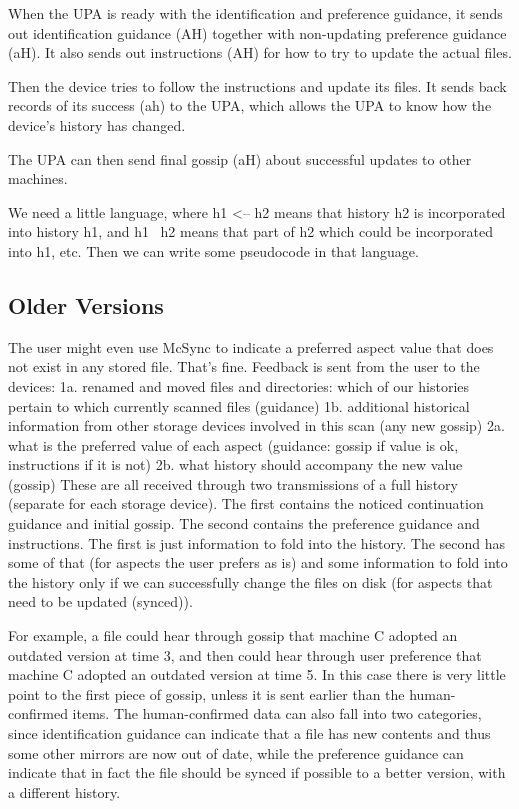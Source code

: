 \documentclass{book}
\begin{document}
When the UPA is ready with the identification and preference guidance, it sends out identification guidance (AH) together with non-updating preference guidance (aH).  It also sends out instructions (AH) for how to try to update the actual files.

Then the device tries to follow the instructions and update its files.  It sends back records of its success (ah) to the UPA, which allows the UPA to know how the device's history has changed.

The UPA can then send final gossip (aH) about successful updates to other machines.

We need a little language, where h1 <-- h2 means that history h2 is incorporated into history h1, and h1 \ h2 means that part of h2 which could be incorporated into h1, etc.  Then we can write some pseudocode in that language.


\subsection{Older Versions}

The user might even use McSync to indicate a preferred aspect value that does not exist in any stored file.  That's fine.
Feedback is sent from the user to the devices:
	1a. renamed and moved files and directories: which of our histories pertain to which currently scanned files
	   (guidance)
	1b. additional historical information from other storage devices involved in this scan
	   (any new gossip)
	2a. what is the preferred value of each aspect
	   (guidance: gossip if value is ok, instructions if it is not)
	2b. what history should accompany the new value
	   (gossip)
These are all received through two transmissions of a full history (separate for each storage device).
The first contains the noticed continuation guidance and initial gossip.
The second contains the preference guidance and instructions.
The first is just information to fold into the history.
The second has some of that (for aspects the user prefers as is) and some information to fold into the history only if we can successfully change the files on disk (for aspects that need to be updated (synced)).

For example, a file could hear through gossip that machine C adopted an outdated version at time 3, and then could hear through user preference that machine C adopted an outdated version at time 5.  In this case there is very little point to the first piece of gossip, unless it is sent earlier than the human-confirmed items.
The human-confirmed data can also fall into two categories, since identification guidance can indicate that a file has new contents and thus some other mirrors are now out of date, while the preference guidance can indicate that in fact the file should be synced if possible to a better version, with a different history.
\end{document}
